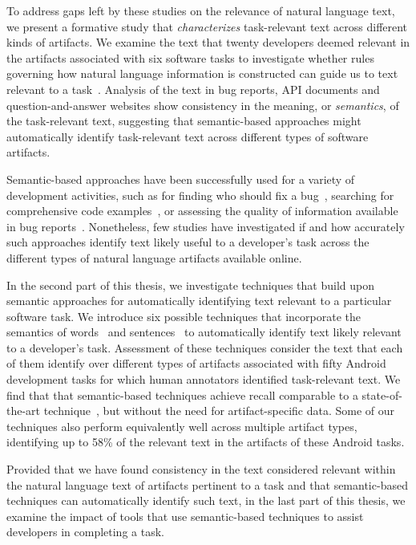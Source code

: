 To address gaps left by these studies on the relevance of natural language text,
we present a formative study that \textit{characterizes} task-relevant text 
across different kinds of artifacts. 
We examine the text that twenty developers deemed relevant in the  artifacts  associated with six software tasks to investigate whether 
rules governing how natural language information
is constructed can guide us to text relevant to a task~\cite{Kintsch1978a}.
Analysis of the  text  in bug
reports, API documents and question-and-answer websites 
 show consistency in the meaning, or \textit{semantics}, of the
task-relevant text, suggesting that 
semantic-based approaches might automatically identify
task-relevant text across different types of software artifacts.







Semantic-based approaches have been successfully used for a variety of development activities,
such as for finding who should fix a bug~\cite{yang2016}, searching for comprehensive code examples~\cite{silva2019}, or assessing the quality of information available in bug reports~\cite{chaparro2019}.
Nonetheless, few studies have investigated if and how accurately such approaches identify
text likely 
useful to a developer's task across the different types of natural language artifacts available online.


In the second part of this thesis, we investigate
techniques that build upon semantic approaches 
for automatically identifying text relevant to a particular software task.
We introduce six possible techniques that incorporate the semantics of words~\cite{Mikolov2013, Devlin2018Bert}
and sentences~\cite{fillmore1976frame, marques2021}
to automatically identify text likely relevant to a developer's task.
Assessment of these techniques consider the text that each of them identify
 over different types of artifacts
associated with fifty Android development tasks 
for which human annotators identified task-relevant text.
We find that that semantic-based techniques
achieve recall comparable to a state-of-the-art technique~\cite{Xu2017}, but without the need for artifact-specific data. Some of our techniques also perform equivalently well across
multiple artifact types, identifying up to 58\%
of the relevant text in the artifacts of these Android tasks.





Provided that we have found consistency in the text considered relevant within the natural
language text of artifacts pertinent to a task and that semantic-based techniques 
can automatically identify such text, in the last part of this thesis, we 
examine the impact of tools that use semantic-based techniques to assist developers in 
completing a task. 



